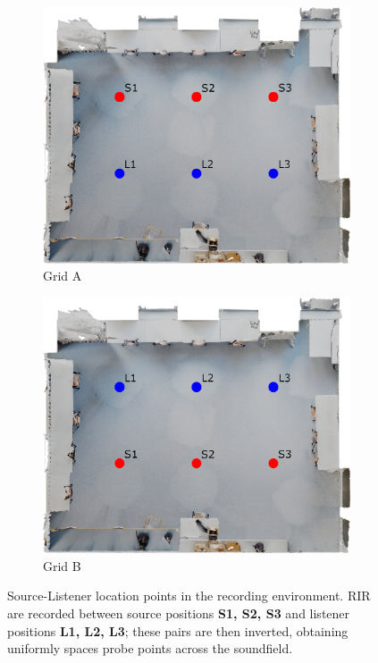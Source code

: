\begin{figure}
    \centering
    \begin{subfigure}[t]{0.45\textwidth}
       \centering
       \includegraphics[width=\textwidth]{grid-a}
       \caption{Grid A}
       \label{fig:grid-a-probes}
    \end{subfigure}
    \begin{subfigure}[t]{0.45\textwidth}
       \centering
       \includegraphics[width=\textwidth]{grid-b}
       \caption{Grid B}
       \label{fig:grid-b-probes}
    \end{subfigure}
\caption{Source-Listener location points in the recording environment. RIR are recorded between source positions \textbf{S1, S2, S3} and listener positions \textbf{L1, L2, L3}; these pairs are then inverted, obtaining uniformly spaces probe points across the soundfield.}
\label{fig:rir-recording-probes}
\end{figure}

